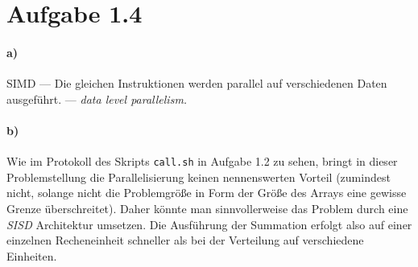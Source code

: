 \documentclass[a4paper,
               12pt,
               BCOR12mm,
               ]{scrartcl}
\begin{document}
  \section*{Aufgabe 1.4}

	\paragraph{a)} SIMD --- Die gleichen Instruktionen werden parallel auf verschiedenen
				Daten ausgeführt. --- \emph{data level parallelism.}
	\paragraph{b)} 
	Wie im Protokoll des Skripts \verb|call.sh| in Aufgabe 1.2 zu sehen, bringt in dieser
	Problemstellung die Parallelisierung keinen nennenswerten Vorteil (zumindest nicht,
	solange nicht die Problemgröße in Form der Größe des Arrays eine gewisse Grenze
	überschreitet). Daher könnte man sinnvollerweise das Problem durch eine \emph{SISD}
	Architektur umsetzen. Die Ausführung der Summation erfolgt also auf einer einzelnen
	Recheneinheit schneller als bei der Verteilung auf verschiedene Einheiten.
	

		\nocite{*}
		
		
\end{document}
